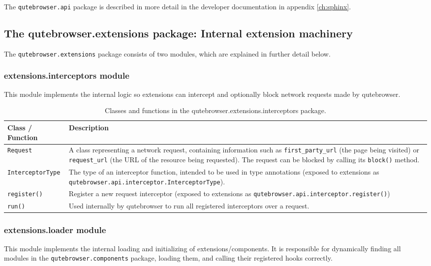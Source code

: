 The \verb|qutebrowser.api| package is described in more detail in the developer
documentation in appendix \ref{ch:sphinx}.

\subsection[The qutebrowser.extensions package]{The qutebrowser.extensions package: Internal extension machinery}

The \verb|qutebrowser.extensions| package consists of two modules, which are
explained in further detail below.

\subsubsection{extensions.interceptors module}
This module implements the internal logic so extensions can intercept and
optionally block network requests made by qutebrowser.

\begin{table}[H]
  \centering
  \begin{tabulary}{\linewidth}{lL}
    \toprule
    Class / Function & Description \\
    \midrule
    \verb|Request| & A class representing a network request, containing
                     information such as \verb|first_party_url| (the page being
                     visited) or \verb|request_url| (the URL of the resource
                     being requested). The request can be blocked by calling its
                     \verb|block()| method. \\
    \verb|InterceptorType| & The type of an interceptor function, intended to be
                             used in type annotations (exposed to extensions as
                             \verb|qutebrowser.api.interceptor.InterceptorType|). \\
    \verb|register()| & Register a new request interceptor (exposed to
                       extensions as \verb|qutebrowser.api.interceptor.register()|) \\
    \verb|run()| & Used internally by qutebrowser to run all registered
                  interceptors over a request. \\
    \bottomrule
  \end{tabulary}
  \caption{Classes and functions in the qutebrowser.extensions.interceptors package.}
\end{table}

\subsubsection{extensions.loader module}
This module implements the internal loading and initializing of
extensions/components. It is responsible for dynamically finding all modules
in the \verb|qutebrowser.components| package, loading them, and calling their
registered hooks correctly.

